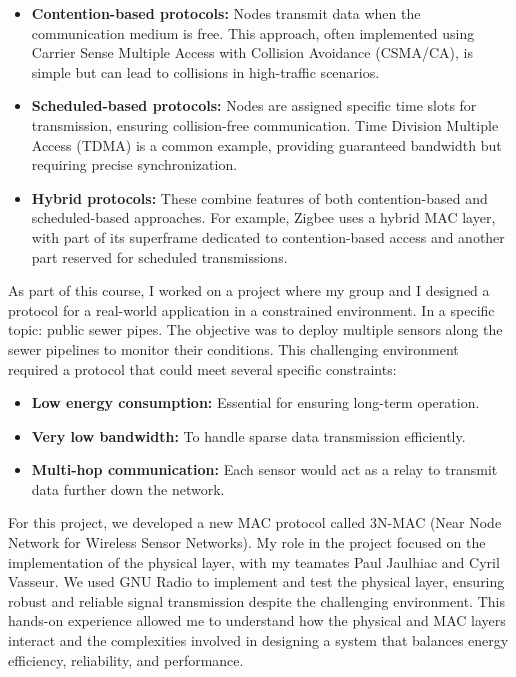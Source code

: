 \begin{itemize}
    \item \textbf{Contention-based protocols:} Nodes transmit data when the communication medium is free. This approach, often implemented using Carrier Sense Multiple Access with Collision Avoidance (CSMA/CA), is simple but can lead to collisions in high-traffic scenarios.
    \item \textbf{Scheduled-based protocols:} Nodes are assigned specific time slots for transmission, ensuring collision-free communication. Time Division Multiple Access (TDMA) is a common example, providing guaranteed bandwidth but requiring precise synchronization.
    \item \textbf{Hybrid protocols:} These combine features of both contention-based and scheduled-based approaches. For example, Zigbee uses a hybrid MAC layer, with part of its superframe dedicated to contention-based access and another part reserved for scheduled transmissions.
\end{itemize}

As part of this course, I worked on a project where my group and I designed a protocol for a real-world application in a constrained environment. In a specific topic: public sewer pipes. The objective was to deploy multiple sensors along the sewer pipelines to monitor their conditions. This challenging environment required a protocol that could meet several specific constraints:

\begin{itemize}
    \item \textbf{Low energy consumption:} Essential for ensuring long-term operation.
    \item \textbf{Very low bandwidth:} To handle sparse data transmission efficiently.
    \item \textbf{Multi-hop communication:} Each sensor would act as a relay to transmit data further down the network.
\end{itemize}

For this project, we developed a new MAC protocol called 3N-MAC (Near Node Network for Wireless Sensor Networks). My role in the project focused on the implementation of the physical layer, with my teamates Paul Jaulhiac and Cyril Vasseur. We used GNU Radio to implement and test the physical layer, ensuring robust and reliable signal transmission despite the challenging environment. This hands-on experience allowed me to understand how the physical and MAC layers interact and the complexities involved in designing a system that balances energy efficiency, reliability, and performance.

